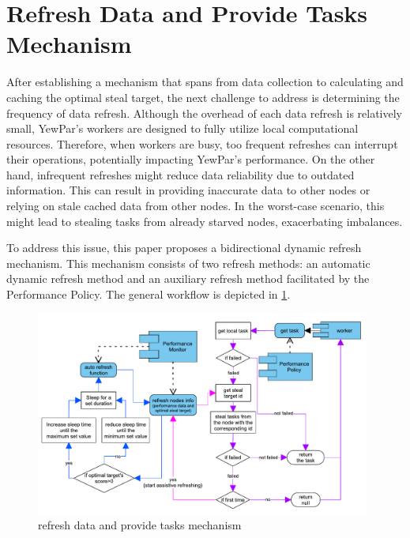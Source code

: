 \documentclass{mproj}
\begin{document}
\section{Refresh Data and Provide Tasks Mechanism}

After establishing a mechanism that spans from data collection to calculating and caching the optimal steal target,
the next challenge to address is determining the frequency of data refresh.
Although the overhead of each data refresh is relatively small,
YewPar's workers are designed to fully utilize local computational resources.
Therefore, when workers are busy, too frequent refreshes can interrupt their operations,
potentially impacting YewPar's performance.
On the other hand, infrequent refreshes might reduce data reliability due to outdated information.
This can result in providing inaccurate data to other nodes or relying on stale cached data from other nodes.
In the worst-case scenario, this might lead to stealing tasks from already starved nodes, exacerbating imbalances.

To address this issue, this paper proposes a bidirectional dynamic refresh mechanism.
This mechanism consists of two refresh methods: an automatic dynamic refresh method and an auxiliary refresh method facilitated by the Performance Policy.
The general workflow is depicted in \cref{fig:refresh_provide}.

\begin{figure}[h]
    \centering
    \includegraphics[width=0.98\textwidth]{images/refresh.pdf}
    \caption{refresh data and provide tasks mechanism}
    \label{fig:refresh_provide}
\end{figure}
\FloatBarrier
\end{document}
